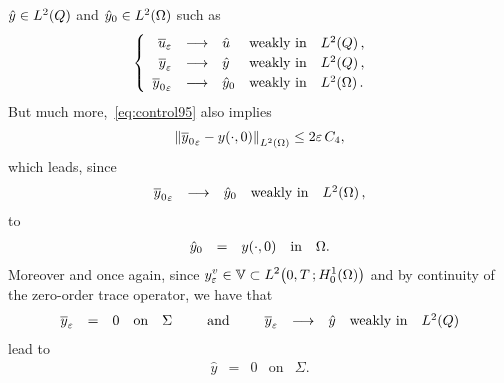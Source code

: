 $\hat{y}\in L^{2}\!\left({Q}\right)$ and ${\hat{y}}_{0}\in L^{2}\!\left({\Omega}\right)$ such as
\begin{equation*}
    \begin{cases}\displaystyle
        \begin{array}{rclll}
            {\overline{u}}_{\varepsilon} & \longrightarrow & \hat{u} & \text{weakly in} &
            L^{2}\!\left({Q}\right),\\
            {\overline{y}}_{\varepsilon} & \longrightarrow & \hat{y} & \text{weakly in} &
            L^{2}\!\left({Q}\right),\\
            {\overline{y}_{0}}_{\varepsilon} & \longrightarrow & {\hat{y}}_{0} &
            \text{weakly in} & L^{2}\!\left({\Omega}\right).
        \end{array}
    \end{cases}
\end{equation*}
But much more,~\eqref{eq:control95} also implies
\begin{equation}\label{eq:control106}
    {\left\|{{\overline{y}_{0}}_{\varepsilon} -  {y}\!\left({\cdot, 0}\right)  }\right\|}_{L^{2}\left({\Omega}\right)} \leq 2\varepsilon\,C_{4},
\end{equation}
which leads, since
\begin{equation}\label{eq:control106p}
    \begin{array}{rclll}
        {\overline{y}_{0}}_{\varepsilon} & \longrightarrow & {\hat{y}}_{0} &
        \text{weakly in} & L^{2}\!\left({\Omega}\right),
    \end{array}
\end{equation}
to
\begin{equation}\label{eq:control107}
    \begin{array}{rclll}
        {\hat{y}}_{0} & = & {y}\!\left({\cdot, 0}\right) & \text{in} & \Omega.
    \end{array}
\end{equation}
Moreover and once again, since $\displaystyle y_{\varepsilon}^{v}\in \mathbb{V}\subset
L^{2}\!\left({0,T\,; H_{0}^{1}(\Omega)}\right)$ and by continuity of the zero-order trace
operator, we have that
\begin{equation*}
    \begin{array}{rclll}
        {\overline{y}}_{\varepsilon} & = & 0 & \text{on} & \Sigma
    \end{array}\qquad\text{and}\qquad
    \begin{array}{rclll}
        {\overline{y}}_{\varepsilon} & \longrightarrow & \hat{y} & \text{weakly in} &
        L^{2}\!\left({Q}\right)
    \end{array}
\end{equation*}
lead to
\begin{equation}\label{eq:new-convergence-34}
    \begin{array}{rclll}
        \hat{y} & = & 0 & \text{on} & \Sigma.
    \end{array}
\end{equation}
